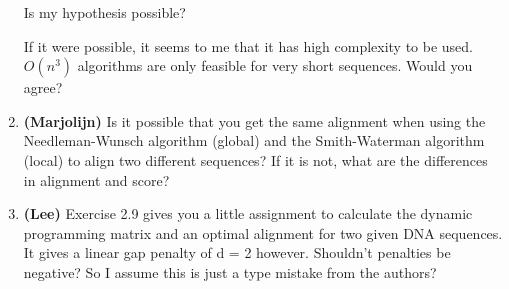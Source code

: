 \documentclass{article}
\begin{document}
\begin{enumerate}
Is my hypothesis possible?

If it were possible, it seems to me that it has high complexity to be
used. $O(n^3)$ algorithms are only feasible for very short sequences.
Would you agree?

\item {\bf (Marjolijn)} Is it possible that you get the same
alignment when using the Needleman-Wunsch algorithm (global) and
the Smith-Waterman algorithm (local) to align two different
sequences? If it is not, what are the differences in alignment
and score?

\item {\bf (Lee)} Exercise 2.9 gives you a little assignment to
calculate the dynamic programming matrix and an optimal alignment
for two given DNA sequences. It gives a linear gap penalty of d = 2
however. Shouldn't penalties be negative? So I assume this is just a
type mistake from the authors?

\end{enumerate}
\end{document}
